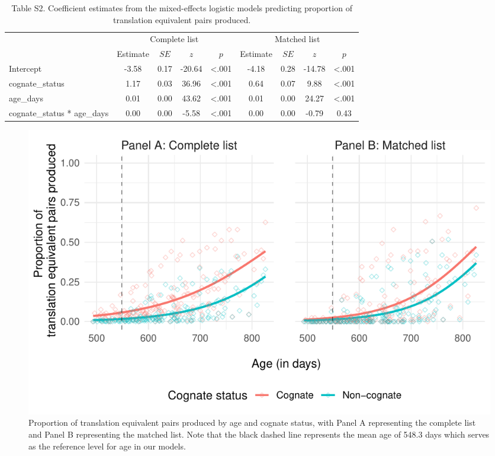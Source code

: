 \documentclass[
  ,man,floatsintext]{apa6}
\begin{document}
\begin{table}[tbp]

\begin{center}
\begin{threeparttable}

\caption{\label{tab:Table S2}Table S2. Coefficient estimates from the mixed-effects logistic models predicting proportion of translation equivalent pairs produced.}

\begin{tabular}{lcccccccc}
\toprule
 & \multicolumn{4}{c}{Complete list} & \multicolumn{4}{c}{Matched list} \\
\cmidrule(r){2-5} \cmidrule(r){6-9}
 & Estimate & $SE$ & $z$ & $p$ & Estimate & $SE$ & $z$ & $p$\\
\midrule
Intercept & -3.58 & 0.17 & -20.64 & <.001 & -4.18 & 0.28 & -14.78 & <.001\\
cognate\_status & 1.17 & 0.03 & 36.96 & <.001 & 0.64 & 0.07 & 9.88 & <.001\\
age\_days & 0.01 & 0.00 & 43.62 & <.001 & 0.01 & 0.00 & 24.27 & <.001\\
cognate\_status * age\_days & 0.00 & 0.00 & -5.58 & <.001 & 0.00 & 0.00 & -0.79 & 0.43\\
\bottomrule
\end{tabular}

\end{threeparttable}
\end{center}

\end{table}

\begin{figure}

{\centering \includegraphics[width=1.2\linewidth]{CogVocab_supplemental_files/figure-latex/FigS2-1} 

}

\caption{Proportion of translation equivalent pairs produced by age and cognate status, with Panel A representing the complete list and Panel B representing the matched list. Note that the black dashed line represents the mean age of 548.3 days which serves as the reference level for age in our models.}\label{fig:FigS2}
\end{figure}
\end{document}
